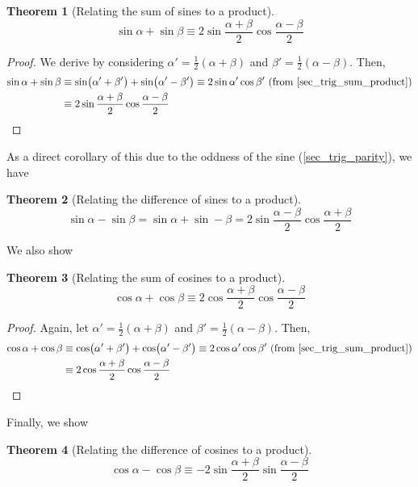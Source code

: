 \documentclass[fleqn,a4paper,11pt]{article}
\newtheorem{theorem}{Theorem}[section]
\begin{document}
    \begin{theorem}[Relating the sum of sines to a product]
    \begin{equation*}
    \sin \alpha + \sin \beta \equiv
        2 \sin \frac{\alpha + \beta}2 \cos \frac{\alpha - \beta}2
    \end{equation*}
    \end{theorem}
    \begin{proof}
    We derive by considering \(\alpha' = \frac 12 (\alpha + \beta)\) and
    \(\beta' = \frac 12 (\alpha - \beta)\). Then,
    \begin{align*}
    \sin \alpha + \sin \beta &\equiv
     \sin(\alpha' + \beta') + \sin(\alpha' - \beta') \equiv
     2\sin \alpha' \cos \beta'\ \text{(from \ref{sec_trig_sum_product})}
    \\&\equiv 2 \sin \frac{\alpha + \beta}2 \cos \frac{\alpha - \beta} 2
    \end{align*}
    \end{proof}
    As a direct corollary of this due to the oddness of the sine
    (\ref{sec_trig_parity}), we have
    \begin{theorem}[Relating the difference of sines to a product]
    \begin{equation*}
    \sin \alpha - \sin \beta =
        \sin \alpha + \sin -\beta =
        2 \sin \frac{\alpha - \beta} 2 \cos\frac{\alpha + \beta} 2
    \end{equation*}
    \end{theorem}
    We also show
    \begin{theorem}[Relating the sum of cosines to a product]
    \begin{equation*}
    \cos \alpha + \cos \beta \equiv
        2 \cos\frac{\alpha + \beta} 2 \cos \frac{\alpha - \beta} 2
    \end{equation*}
    \end{theorem}
    \begin{proof}
    Again, let \(\alpha' = \frac 12 (\alpha + \beta)\) and
    \(\beta' = \frac 12 (\alpha - \beta)\). Then,
    \begin{align*}
     \cos \alpha + \cos \beta &\equiv
     \cos(\alpha' + \beta') + \cos(\alpha' - \beta') \equiv
     2\cos \alpha' \cos \beta'\ \text{(from \ref{sec_trig_sum_product})}
     \\&\equiv 2 \cos\frac{\alpha + \beta} 2 \cos \frac{\alpha - \beta} 2
    \end{align*}
    \end{proof}
    Finally, we show
    \begin{theorem}[Relating the difference of cosines to a product]
    \begin{equation*}
    \cos \alpha - \cos \beta \equiv
     -2 \sin \frac{\alpha + \beta} 2 \sin \frac{\alpha - \beta} 2
    \end{equation*}
    \end{theorem}
\end{document}

